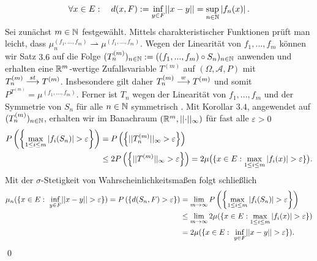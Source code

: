\begin{proof*}
    $$
        \forall x \in E: \quad d(x,F) := \inf_{y \in F}\lvert\lvert x-y \rvert\rvert = \sup_{n \in \mathbb{N}}\left| f_n(x) \right|. 
    $$
    Sei zunächst $m \in \mathbb{N}$ festgewählt. Mittels charakteristischer Funktionen prüft man leicht, dass $\mu_n^{(f_1,...,f_m)} \rightharpoonup \mu^{(f_1,...,f_m)}$. 
    Wegen der Linearität von $f_1,...,f_m$ können wir Satz $3.6$ auf die Folge $(T_n^{(m)})_{n \in \mathbb{N}} := ((f_1,...,f_m)\circ S_n)_{n \in \mathbb{N}}$ anwenden und erhalten eine $\mathbb{R}^m$-wertige Zufallsvariable $T^{(m)}$ auf $(\Omega, \mathcal{A}, P)$ mit 
    $T_n^{(m)} \overset{st}{\longrightarrow} T^{(m)}$. Insbesondere gilt daher $T_n^{(m)} \overset{w}{\longrightarrow} T^{(m)}$ und somit \mbox{$P^{T^{(m)}} = \mu^{(f_1,...,f_m)}$}. 
    Ferner ist $T_n$ wegen der Linearität von $f_1,...,f_m$ und der Symmetrie von $S_n$ für alle $n \in \mathbb{N}$ symmetrisch . Mit Korollar $3.4$, angewendet auf $(T_n^{(m)})_{n \in \mathbb{N}}$, erhalten wir im Banachraum $(\mathbb{R}^m, \lvert\lvert \cdot \rvert\rvert_{\infty})$ für fast alle $\varepsilon >0$
    \begin{align*}
        P\left(\left\{ \max_{1 \leq i \leq m}\left| f_i(S_n) \right| > \varepsilon \right\}\right) &= P\left(\left\{ \lvert\lvert T_n^{(m)} \rvert\rvert_{\infty} > \varepsilon \right\}\right) \\\
                                                                  &\leq 2 P\left(\left\{ \lvert\lvert T^{(m)} \rvert\rvert_{\infty} > \varepsilon \right\}\right) = 2\mu\big(\{x \in E: \max_{1\leq i \leq m}\left| f_i(x) \right| > \varepsilon\}\big).
    \end{align*}
    Mit der $\sigma$-Stetigkeit von Wahrscheinlichkeitsmaßen folgt schließlich
    \begin{align*}
        \mu_n(\{x \in E: \ \inf_{y \in F}\lvert\lvert x-y \rvert\rvert > \varepsilon \}) = P\left(\left\{ d(S_n, F) > \varepsilon \right\}\right)
                                                                     &= \lim_{m \to \infty}P\left(\left\{ \max_{1 \leq i \leq m}\left| f_i(S_n) \right| > \varepsilon \right\}\right) \\\
                                                                    &\leq \lim_{m \to \infty} 2 \mu(\{x \in E: \max_{1\leq i \leq m}\left| f_i(x) \right| > \varepsilon\}) \\\
                                                                    &= 2 \mu(\{x \in E: \ \inf_{y \in F}\lvert\lvert x-y \rvert\rvert > \varepsilon \}).
    \end{align*}
    \qed
\end{proof*}

